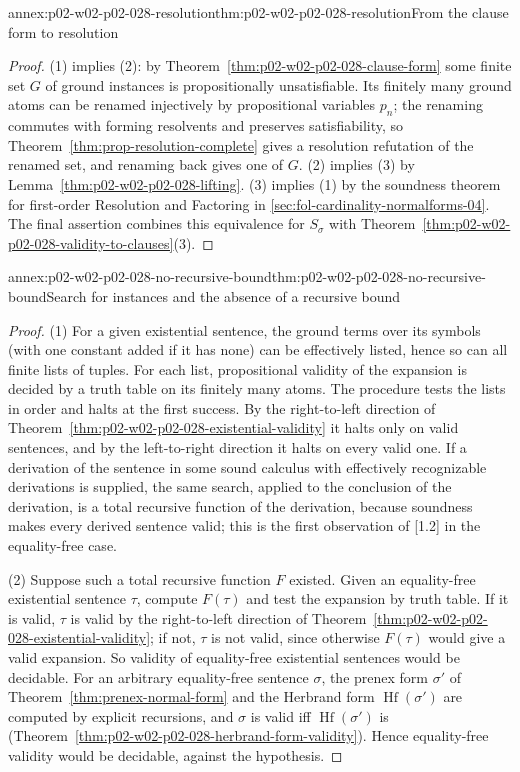 \begin{annexitem}{annex:p02-w02-p02-028-resolution}{thm:p02-w02-p02-028-resolution}{From the clause form to resolution}
\begin{proof}
(1) implies (2): by Theorem~\ref{thm:p02-w02-p02-028-clause-form} some finite
set \(G\) of ground instances is propositionally unsatisfiable.  Its finitely
many ground atoms can be renamed injectively by propositional variables
\(p_n\); the renaming commutes with forming resolvents and preserves
satisfiability, so Theorem~\ref{thm:prop-resolution-complete} gives a
resolution refutation of the renamed set, and renaming back gives one of
\(G\).  (2) implies (3) by Lemma~\ref{thm:p02-w02-p02-028-lifting}.  (3)
implies (1) by the soundness theorem for first-order Resolution and Factoring
in \cref{sec:fol-cardinality-normalforms-04}.  The final assertion combines
this equivalence for \(S_\sigma\) with
Theorem~\ref{thm:p02-w02-p02-028-validity-to-clauses}(3).
\end{proof}
\end{annexitem}

\begin{annexitem}{annex:p02-w02-p02-028-no-recursive-bound}{thm:p02-w02-p02-028-no-recursive-bound}{Search for instances and the absence of a recursive bound}
\begin{proof}
(1)  For a given existential sentence, the ground terms over its symbols
(with one constant added if it has none) can be effectively listed, hence so
can all finite lists of tuples.  For each list, propositional validity of the
expansion is decided by a truth table on its finitely many atoms.  The
procedure tests the lists in order and halts at the first success.  By the
right-to-left direction of
Theorem~\ref{thm:p02-w02-p02-028-existential-validity} it halts only on valid
sentences, and by the left-to-right direction it halts on every valid one.
If a derivation of the sentence in some sound calculus with effectively
recognizable derivations is supplied, the same search, applied to the
conclusion of the derivation, is a total recursive function of the
derivation, because soundness makes every derived sentence valid; this is the
first observation of [1.2] in the equality-free case.

(2)  Suppose such a total recursive function \(F\) existed.  Given an
equality-free existential sentence \(\tau\), compute \(F(\tau)\) and test the
expansion by truth table.  If it is valid, \(\tau\) is valid by the
right-to-left direction of
Theorem~\ref{thm:p02-w02-p02-028-existential-validity}; if not, \(\tau\) is
not valid, since otherwise \(F(\tau)\) would give a valid expansion.  So
validity of equality-free existential sentences would be decidable.  For an
arbitrary equality-free sentence \(\sigma\), the prenex form \(\sigma'\) of
Theorem~\ref{thm:prenex-normal-form} and the Herbrand form
\(\operatorname{Hf}(\sigma')\) are computed by explicit recursions, and
\(\sigma\) is valid iff \(\operatorname{Hf}(\sigma')\) is
(Theorem~\ref{thm:p02-w02-p02-028-herbrand-form-validity}).  Hence
equality-free validity would be decidable, against the hypothesis.
\end{proof}
\end{annexitem}

